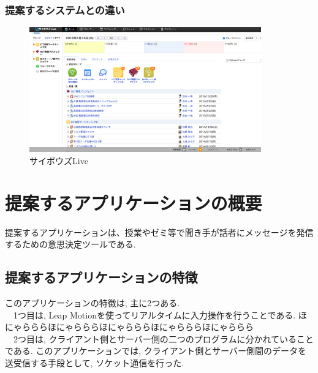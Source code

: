 \documentclass{funthesis}
\begin{document}
\subsection{提案するシステムとの違い}


\begin{figure}[H]
 \begin{center}
  \includegraphics[width=100mm]{./img/cybozulive.png}
 \end{center}
 \caption{サイボウズLive}
 \label{cybozu}
\end{figure}


\chapter{提案するアプリケーションの概要}

提案するアプリケーションは、授業やゼミ等で聞き手が話者にメッセージを発信するための意思決定ツールである. 

\section{提案するアプリケーションの特徴}


このアプリケーションの特徴は, 主に2つある.\\
　1つ目は, Leap Motionを使ってリアルタイムに入力操作を行うことである. ほにゃらららほにゃらららほにゃらららほにゃらららほにゃららら\\
　2つ目は, クライアント側とサーバー側の二つのプログラムに分かれていることである. このアプリケーションでは, クライアント側とサーバー側間のデータを送受信する手段として, ソケット通信を行った. 
\end{document}
